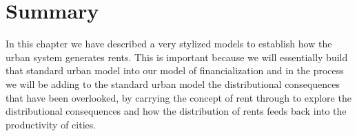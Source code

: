 \section{Summary}
In this chapter we have described a very stylized models to  establish how the urban system generates rents. %
This is important because we will essentially build that standard urban model into our model of financialization and in the process we will be adding to the standard urban model the distributional consequences that have been overlooked, by carrying the concept of rent through to explore the distributional consequences and how the distribution of rents feeds back into the productivity of cities. 

